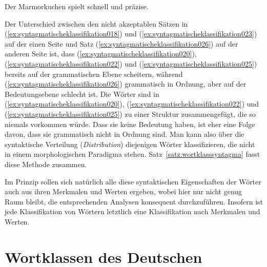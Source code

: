 \begin{exe}
  \ex\label{ex:syntagmatischeklassifikation026}{Der Marmorkuchen spielt schnell und präzise.}
\end{exe}

Der Unterschied zwischen den nicht akzeptablen Sätzen in (\ref{ex:syntagmatischeklassifikation018}) und (\ref{ex:syntagmatischeklassifikation023}) auf der einen Seite und Satz (\ref{ex:syntagmatischeklassifikation026}) auf der anderen Seite ist, dass (\ref{ex:syntagmatischeklassifikation020}), (\ref{ex:syntagmatischeklassifikation022}) und (\ref{ex:syntagmatischeklassifikation025}) bereits auf der grammatischen Ebene scheitern, während (\ref{ex:syntagmatischeklassifikation026}) grammatisch in Ordnung, aber auf der Bedeutungsebene schlecht ist.
Die Wörter sind in (\ref{ex:syntagmatischeklassifikation020}), (\ref{ex:syntagmatischeklassifikation022}) und (\ref{ex:syntagmatischeklassifikation025}) zu einer Struktur zusammengefügt, die so niemals vorkommen würde.
Dass sie keine Bedeutung haben, ist eher eine Folge davon, dass sie grammatisch nicht in Ordnung sind.
Man kann also über die syntaktische Verteilung (\textit{Distribution}) diejenigen Wörter klassifizieren, die nicht in einem morphologischen Paradigma stehen.
Satz~\ref{satz:wortklasssyntagma} fasst diese Methode zusammen.


Im Prinzip sollen sich natürlich alle diese syntaktischen Eigenschaften der Wörter auch aus ihren Merkmalen und Werten ergeben, wobei hier nur nicht genug Raum bleibt, die entsprechenden Analysen konsequent durchzuführen.
Insofern ist jede Klassifikation von Wörtern letztlich eine Klassifikation nach Merkmalen und Werten.


\section{Wortklassen des Deutschen}
\label{sec:wortklassendesdeutschen}

